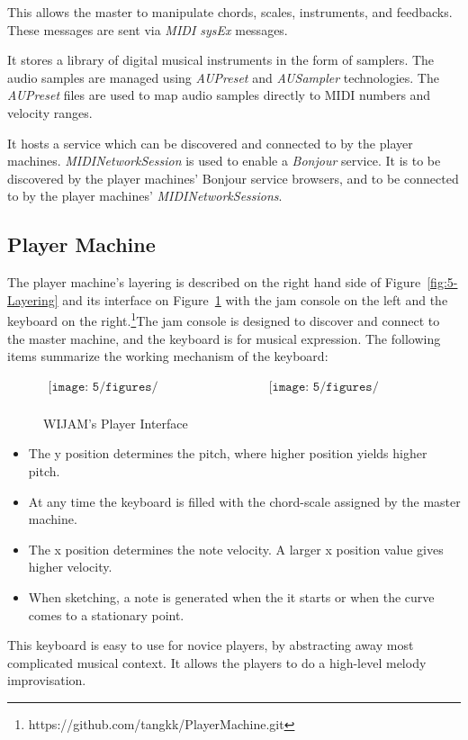 This allows the master to manipulate chords, scales, instruments, and feedbacks. These messages are sent via \textit{MIDI sysEx} messages.

It stores a library of digital musical instruments in the form of samplers. The audio samples are managed using \textit{AUPreset} and \textit{AUSampler} technologies\cite{AUSampler}. The \textit{AUPreset} files are used to map audio samples directly to MIDI numbers and velocity ranges.

It hosts a service which can be discovered and connected to by the player machines. \textit{MIDINetworkSession} is used to enable a \textit{Bonjour} service. It is to be discovered by the player machines' Bonjour service browsers, and to be connected to by the player machines' \textit{MIDINetworkSessions}.

\subsection{Player Machine}

The player machine's layering is described on the right hand side of Figure~\ref{fig:5-Layering} and its interface on Figure~\ref{fig:5-PlayerMachineVC} with the jam console on the left and the keyboard on the right.\footnote{https://github.com/tangkk/PlayerMachine.git}The jam console is designed to discover and connect to the master machine, and the keyboard is for musical expression. The following items summarize the working mechanism of the keyboard:
\begin{figure}[htbp]
\begin{center}$
\begin{array}{cc}
\texttt{[image: 5/figures/PlayerMachineVC.png]} &
\texttt{[image: 5/figures/Simple.png]} \\
\end{array}$
\end{center}
\caption{WIJAM's Player Interface}
\label{fig:5-PlayerMachineVC}
\end{figure}
\begin{itemize}
\item
The y position determines the pitch, where higher position yields higher pitch.
\item
At any time the keyboard is filled with the chord-scale assigned by the master machine.
\item
The x position determines the note velocity. A larger x position value gives higher velocity.
\item
When sketching, a note is generated when the it starts or when the curve comes to a stationary point.
\end{itemize}
This keyboard is easy to use for novice players, by abstracting away most complicated musical context. It allows the players to do a high-level melody improvisation.

